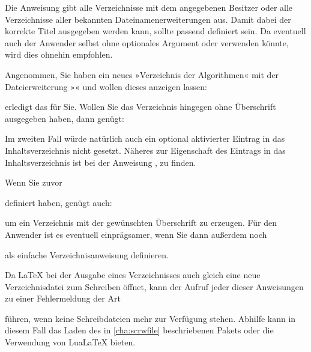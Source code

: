 Die Anweisung  gibt alle
Verzeichnisse mit dem angegebenen Besitzer oder alle Verzeichnisse aller
bekannten Dateinamenerweiterungen aus. Damit dabei der
korrekte Titel ausgegeben werden kann, sollte
 passend definiert sein.
Da eventuell auch der Anwender selbst  ohne
optionales Argument oder  verwenden könnte, wird dies
ohnehin empfohlen.
\begin{Example}
  Angenommen, Sie haben ein neues »Verzeichnis der Algorithmen« mit der
  Dateierweiterung »« und wollen dieses anzeigen lassen:
\begin{lstcode}
\end{lstcode}
  erledigt das für Sie. Wollen Sie das Verzeichnis hingegen ohne Überschrift
  ausgegeben haben, dann genügt:
\begin{lstcode}
\end{lstcode}
  Im zweiten Fall würde natürlich auch ein optional aktivierter Eintrag in das
  Inhaltsverzeichnis nicht gesetzt. Näheres zur Eigenschaft des Eintrags in
  das Inhaltsverzeichnis ist bei der Anweisung
  ,  zu
  finden.

  Wenn Sie zuvor
\begin{lstcode}
  \newcommand*{\listofloaname}{%
    Verzeichnis der Algorithmen%
  }
\end{lstcode}
  definiert haben, genügt auch:
\begin{lstcode}
\end{lstcode}
  um ein Verzeichnis mit der gewünschten Überschrift zu erzeugen. Für den
  Anwender ist es eventuell einprägsamer, wenn Sie dann außerdem noch
\begin{lstcode}
  \newcommand*{\listofalgorithms}{\listoftoc{loa}}
\end{lstcode}
  als einfache Verzeichnisanweisung definieren.
\end{Example}

Da \LaTeX{} bei der Ausgabe eines Verzeichnisses auch
gleich eine neue Verzeichnisdatei zum Schreiben öffnet, kann der Aufruf jeder
dieser Anweisungen zu einer Fehlermeldung der Art
führen, wenn keine Schreibdateien mehr zur Verfügung stehen. Abhilfe kann in
diesem Fall das Laden des in \autoref{cha:scrwfile} beschriebenen Pakets
oder die Verwendung von Lua\LaTeX{} bieten.

